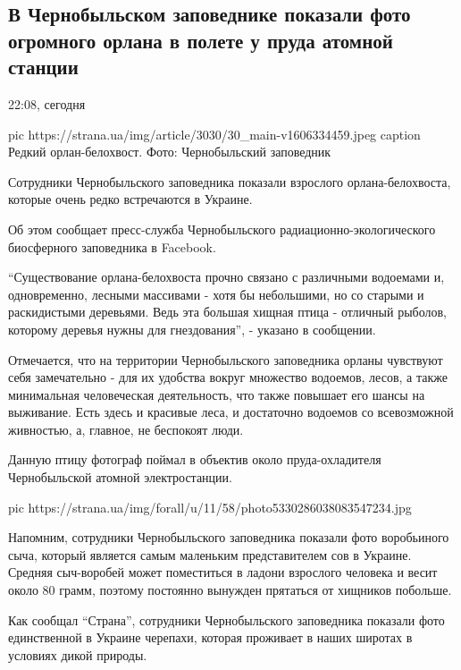 
 
 
 
 
 
\subsection{В Чернобыльском заповеднике показали фото огромного орлана в полете у пруда атомной станции}
\label{sec:25_11_2020.news.ua.strana.1.orlan_chaes}

22:08, сегодня

\ifcmt
pic https://strana.ua/img/article/3030/30_main-v1606334459.jpeg
caption Редкий орлан-белохвост. Фото: Чернобыльский заповедник
\fi

Сотрудники Чернобыльского заповедника показали взрослого
орлана-белохвоста, которые очень редко встречаются в Украине. 

Об этом сообщает пресс-служба Чернобыльского радиационно-экологического
биосферного заповедника в Facebook.

\enquote{Существование орлана-белохвоста прочно связано с различными водоемами и,
одновременно, лесными массивами - хотя бы небольшими, но со старыми и
раскидистыми деревьями. Ведь эта большая хищная птица - отличный рыболов,
которому деревья нужны для гнездования}, - указано в сообщении. 

Отмечается, что на территории Чернобыльского заповедника орланы чувствуют
себя замечательно - для их удобства вокруг множество водоемов, лесов, а
также минимальная человеческая деятельность, что также повышает его шансы
на выживание. Есть здесь и красивые леса, и достаточно водоемов со
всевозможной живностью, а, главное, не беспокоят люди.

Данную птицу фотограф поймал в объектив около пруда-охладителя
Чернобыльской атомной электростанции. 

\ifcmt
pic https://strana.ua/img/forall/u/11/58/photo5330286038083547234.jpg
\fi

Напомним, сотрудники Чернобыльского заповедника показали фото воробьиного
сыча, который является самым маленьким представителем сов в Украине.
Средняя сыч-воробей может поместиться в ладони взрослого человека и весит
около 80 грамм, поэтому постоянно вынужден прятаться от хищников
побольше. 

Как сообщал \enquote{Страна}, сотрудники Чернобыльского заповедника показали фото
единственной в Украине черепахи, которая проживает в наших широтах в условиях
дикой природы. 


